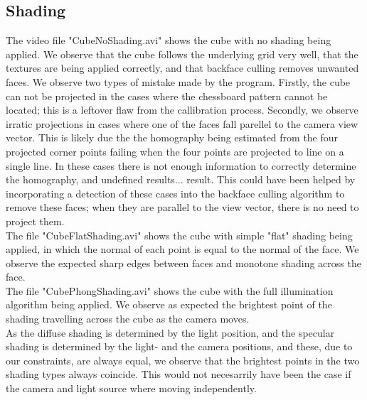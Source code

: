 \subsection{Shading}
The video file "CubeNoShading.avi" shows the cube with no shading being applied. We observe that the cube follows the underlying grid very well, that the textures are being applied correctly, and that backface culling removes unwanted faces. We observe two types of mistake made by the program. Firstly, the cube can not be projected in the cases where the chessboard pattern cannot be located; this is a leftover flaw from the callibration process. Secondly, we observe irratic projections in cases where one of the faces fall parellel to the camera view vector. This is likely due the the homography being estimated from the four projected corner points failing when the four points are projected to line on a single line. In these cases there is not enough information to correctly determine the homography, and undefined results... result. This could have been helped by incorporating a detection of these cases into the backface culling algorithm to remove these faces; when they are parallel to the view vector, there is no need to project them.\\
The file "CubeFlatShading.avi" shows the cube with simple "flat" shading being applied, in which the normal of each point is equal to the normal of the face. We observe the expected sharp edges between faces and monotone shading across the face.\\
The file "CubePhongShading.avi" shows the cube with the full illumination algorithm being applied. We observe as expected the brightest point of the shading travelling across the cube as the camera moves.\\
As the diffuse shading is determined by the light position, and the specular shading is determined by the light- and the camera positions, and these, due to our constraints, are always equal, we observe that the brightest points in the two shading types always coincide. This would not necesarrily have been the case if the camera and light source where moving independently.